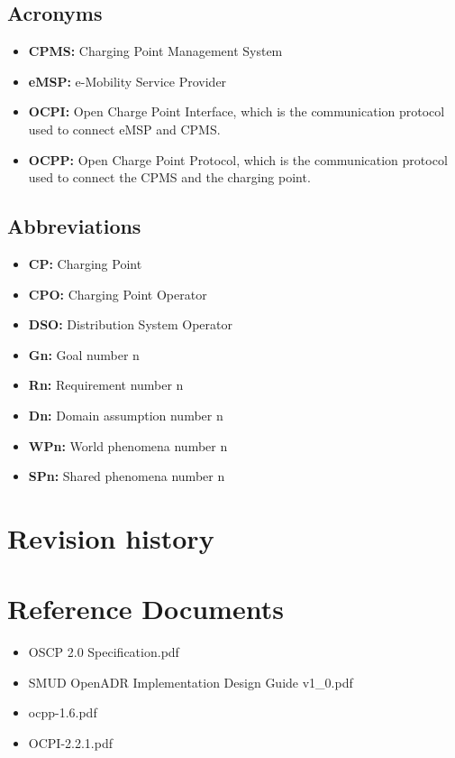 \documentclass{Configuration_Files/PoliMi3i_thesis}
\begin{document}
\subsection{Acronyms}

\begin{itemize}
    \item \textbf{CPMS:} Charging Point Management System
    \item \textbf{eMSP:} e-Mobility Service Provider
    \item \textbf{OCPI:} Open Charge Point Interface, which is the communication protocol used to connect eMSP and CPMS.
    \item \textbf{OCPP:} Open Charge Point Protocol, which is the communication protocol used to connect the CPMS and the charging point.
\end{itemize}

\subsection{Abbreviations}

\begin{itemize}
    \item \textbf{CP:} Charging Point
    \item \textbf{CPO:} Charging Point Operator
    \item \textbf{DSO:} Distribution System Operator
    \item \textbf{Gn:} Goal number n
    \item \textbf{Rn:} Requirement number n
    \item \textbf{Dn:} Domain assumption number n
    \item \textbf{WPn:} World phenomena number n
    \item \textbf{SPn:} Shared phenomena number n
\end{itemize}

\section{Revision history}

\section{Reference Documents}
\begin{itemize}
    \item OSCP 2.0 Specification.pdf
    \item SMUD OpenADR Implementation Design Guide v1\_0.pdf
    \item ocpp-1.6.pdf
    \item OCPI-2.2.1.pdf
\end{itemize}
\end{document}
